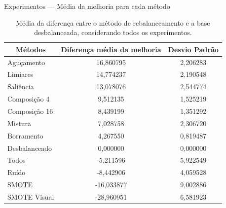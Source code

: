 \documentclass[10pt]{beamer}
\begin{document}
\begin{frame}{Experimentos --- Média da melhoria para cada método}
  \setlength\leftmargini{1em}
  \begin{table}
    \caption{Média da diferença entre o método de rebalanceamento e a base desbalanceada, considerando todos os experimentos.}
    \footnotesize{
    \begin{tabular}{|l|c|c|}
    \hline
    \multicolumn{1}{|c|}{\textbf{Métodos}} & \textbf{Diferença média da melhoria} & \textbf{Desvio Padrão} \\ \hline
    Aguçamento                             & 16,860795                            & 2,206283     \\ \hline
    Limiares                               & 14,774237                            & 2,190548     \\ \hline
    Saliência                              & 13,078076                            & 2,544774     \\ \hline
    Composição 4                           & 9,512135                             & 1,525219     \\ \hline
    Composição 16                          & 8,439199                             & 1,351292     \\ \hline
    Mistura                                & 7,028758                             & 2,306720     \\ \hline
    Borramento                             & 4,267550                             & 0,819487     \\ \hline
    Desbalanceado                          & 0,000000                             & 0,000000     \\ \hline
    Todos                                  & -5,211596                            & 5,922549     \\ \hline
    Ruído                                  & -8,442906                            & 4,059528     \\ \hline
    SMOTE                                  & -16,033877                           & 9,002886     \\ \hline
    SMOTE Visual                           & -28,960951                           & 6,581923     \\ \hline
    \end{tabular}
    }
  \end{table}
\end{frame}
\end{document}
